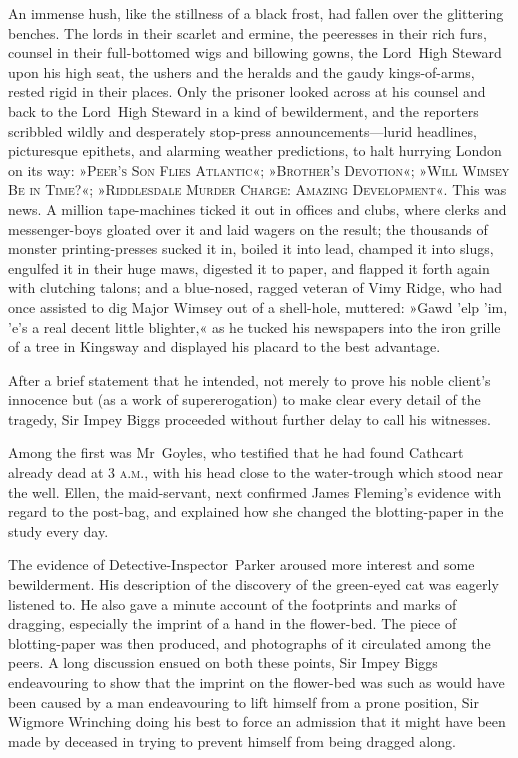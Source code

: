 An immense hush, like the stillness of a black frost, had fallen over the glittering benches. The lords in their scarlet and ermine, the peeresses in their rich furs, counsel in their full-bottomed wigs and billowing gowns, the Lord~High Steward upon his high seat, the ushers and the heralds and the gaudy kings-of-arms, rested rigid in their places. Only the prisoner looked across at his counsel and back to the Lord~High Steward in a kind of bewilderment, and the reporters scribbled wildly and desperately stop-press announcements—lurid headlines, picturesque epithets, and alarming weather predictions, to halt hurrying London on its way: »\textsc{Peer's Son Flies Atlantic}«; »\textsc{Brother's Devotion}«; »\textsc{Will Wimsey Be in Time?}«; »\textsc{Riddlesdale Murder Charge: Amazing Development}«. This was news. A million tape-machines ticked it out in offices and clubs, where clerks and messenger-boys gloated over it and laid wagers on the result; the thousands of monster printing-presses sucked it in, boiled it into lead, champed it into slugs, engulfed it in their huge maws, digested it to paper, and flapped it forth again with clutching talons; and a blue-nosed, ragged veteran of Vimy Ridge, who had once assisted to dig Major Wimsey out of a shell-hole, muttered: »Gawd 'elp 'im, 'e's a real decent little blighter,« as he tucked his newspapers into the iron grille of a tree in Kingsway and displayed his placard to the best advantage.

After a brief statement that he intended, not merely to prove his noble client's innocence but (as a work of supererogation) to make clear every detail of the tragedy, Sir Impey Biggs proceeded without further delay to call his witnesses.

Among the first was Mr~Goyles, who testified that he had found Cathcart already dead at 3 \textsc{a.m.}, with his head close to the water-trough which stood near the well. Ellen, the maid-servant, next confirmed James Fleming's evidence with regard to the post-bag, and explained how she changed the blotting-paper in the study every day.

The evidence of Detective-Inspector~Parker aroused more interest and some bewilderment. His description of the discovery of the green-eyed cat was eagerly listened to. He also gave a minute account of the footprints and marks of dragging, especially the imprint of a hand in the flower-bed. The piece of blotting-paper was then produced, and photographs of it circulated among the peers. A long discussion ensued on both these points, Sir Impey Biggs endeavouring to show that the imprint on the flower-bed was such as would have been caused by a man endeavouring to lift himself from a prone position, Sir Wigmore Wrinching doing his best to force an admission that it might have been made by deceased in trying to prevent himself from being dragged along.

